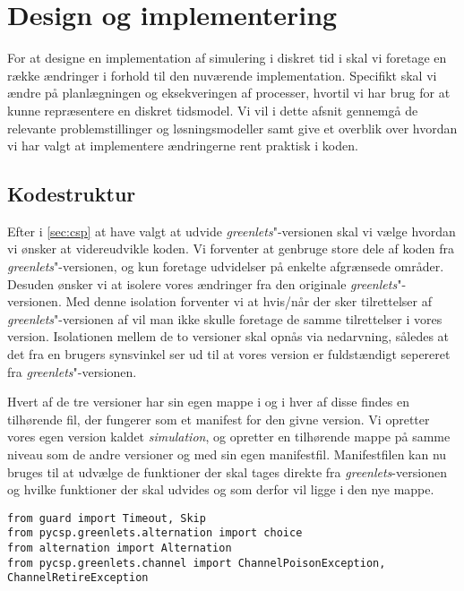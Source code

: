 
\section{Design og implementering}
For at designe en implementation af simulering i diskret tid i \pycsp skal vi foretage en række ændringer i forhold til den nuværende implementation. Specifikt skal vi ændre på planlægningen og eksekveringen af processer, hvortil vi har brug for at kunne repræsentere en diskret tidsmodel. Vi vil i dette afsnit gennemgå de relevante problemstillinger og løsningsmodeller samt give et overblik over hvordan vi har valgt at implementere ændringerne rent praktisk i koden. 


\subsection{Kodestruktur}  
Efter i \cref{sec:csp} at have valgt at udvide \emph{greenlets}"-versionen skal vi vælge hvordan vi ønsker at videreudvikle koden. Vi forventer at genbruge store dele af koden fra \emph{greenlets}"-versionen, og kun foretage udvidelser på enkelte afgrænsede områder. Desuden ønsker vi at isolere vores ændringer fra den originale \emph{greenlets}"-versionen. Med denne isolation forventer vi at hvis/når der sker tilrettelser af \emph{greenlets}"-versionen af \pycsp vil man ikke skulle foretage de samme tilrettelser i vores version. 
Isolationen mellem de to versioner skal opnås via nedarvning, således at det fra en brugers synsvinkel ser ud til at vores version er fuldstændigt sepereret fra \emph{greenlets}"-versionen.

Hvert af de tre versioner har sin egen mappe i \pycsp og i hver af disse findes en tilhørende  fil, der fungerer som et manifest for den givne version. Vi opretter vores egen version kaldet \emph{simulation}, og opretter en tilhørende mappe på samme niveau som de andre versioner og med sin egen manifestfil. Manifestfilen kan nu bruges til at udvælge de funktioner der skal tages direkte fra \emph{greenlets}-versionen og hvilke funktioner der skal udvides og som derfor vil ligge i den nye mappe.

\begin{lstlisting}[float=hbtp,label=fig:init,caption=Uddrag af \code{\_\_init\_\_.py} for simulationsversionen.]
from guard import Timeout, Skip
from pycsp.greenlets.alternation import choice
from alternation import Alternation
from pycsp.greenlets.channel import ChannelPoisonException, ChannelRetireException
\end{lstlisting}

